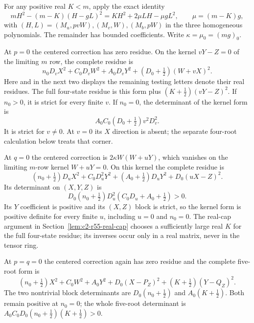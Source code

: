 For any positive real $K<m$, apply the exact identity
\begin{equation}\label{eq:c2-r65-centered}
 mH^2-(m-K)(H-gL)^2
   =KH^2+2\mu LH-\mu gL^2,\qquad \mu=(m-K)g,
\end{equation}
with $(H,L)=(M_u,pvW),(M_v,W),(M_b,pW)$ in the three
homogeneous polynomials. The remainder has bounded coefficients.
Write $\kappa=\mu_0=(mg)_0$.

At $p=0$ the centered correction has zero residue. On the kernel
$vY-Z=0$ of the limiting $m$ row, the complete residue is
\begin{equation}
 n_0D_vX^2+C_0D_vW^2+A_0D_vY^2
       +(D_0+\tfrac12)(W+vX)^2.\tag{R6.5}\label{eq:c2-r65-kernel-u}
\end{equation}
Here and in the next two displays the remaining testing letters denote
their real residues. The full four-state residue is this form plus
$(K+\tfrac12)(vY-Z)^2$. If $n_0>0$, it is strict for every finite
$v$. If $n_0=0$, the determinant of the kernel form is
\[
 A_0C_0(D_0+\tfrac12)v^2D_v^2.
\]
It is strict for $v\ne0$. At $v=0$ its $X$ direction is absent;
the separate four-root calculation below treats that corner.

At $q=0$ the centered correction is
$2\kappa W(W+uY)$, which vanishes on the limiting $m$-row kernel
$W+uY=0$. On this kernel the complete residue is
\begin{equation}
 (n_0+\tfrac12)D_uX^2+C_0D_u^2Y^2
       +(A_0+\tfrac12)D_uY^2+D_0(uX-Z)^2.\tag{R6.6}\label{eq:c2-r65-kernel-v}
\end{equation}
Its determinant on $(X,Y,Z)$ is
\[
 D_0(n_0+\tfrac12)D_u^2(C_0D_u+A_0+\tfrac12)>0.
\]
Its $Y$ coefficient is positive and its $(X,Z)$ block is strict, so
the kernel form is positive definite for every finite $u$, including
$u=0$ and $n_0=0$. The real-cap argument in
Section~\ref{lem:c2-r55-real-cap} chooses a sufficiently large real
$K$ for the full four-state residue; its inverses occur only in a
real matrix, never in the tensor ring.

At $p=q=0$ the centered correction again has zero residue and the
complete five-root form is
\begin{equation}
 (n_0+\tfrac12)X^2+C_0W^2+A_0Y^2+D_0(X-P_Z)^2
                 +(K+\tfrac12)(Y-Q_Z)^2.\tag{R6.7}\label{eq:c2-r65-double}
\end{equation}
The two nontrivial block determinants are
$D_0(n_0+\tfrac12)$ and $A_0(K+\tfrac12)$. Both remain positive
at $n_0=0$; the whole five-root determinant is
$A_0C_0D_0(n_0+\tfrac12)(K+\tfrac12)>0$.

